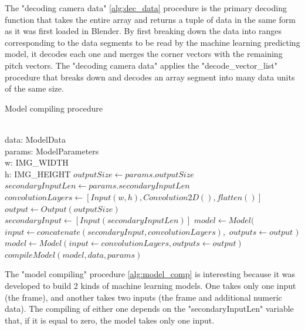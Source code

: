 \documentclass[
    11pt,
    oneside
]{report}
\begin{document}
The "decoding camera data" \ref{alg:dec_data} procedure is the primary decoding function that takes the entire array and returns a tuple of data in the same form as it was first loaded in Blender. By first breaking down the data into ranges corresponding to the data segments to be read by the machine learning predicting model, it decodes each one and merges the corner vectors with the remaining pitch vectors. The "decoding camera data" applies the "decode\_vector\_list" procedure that breaks down and decodes an array segment into many data units of the same size.


\begin{algorithm}[H]
\begin{algorithmic}
\caption{Model compiling procedure}\label{alg:model_comp}
\Require \\
    data: ModelData \\
    params: ModelParameters \\
    w: IMG\_WIDTH \\
    h: IMG\_HEIGHT
\State
\State $outputSize \gets params.outputSize$
\State $secondaryInputLen \gets params.secondaryInputLen$
\State $convolutionLayers \gets [Input(w, h), Convolution2D(), flatten()]$
\State $output \gets Output(outputSize)$
    \State $secondaryInput \gets [Input(secondaryInputLen)]$
    \State $model \gets Model($
        \State \indent $input \gets concatenate(secondaryInput, convolutionLayers),$
            \State \indent $outputs \gets output$
    \State $)$
\Else
    \State $model \gets Model(input \gets convolutionLayers, outputs \gets output)$
\EndIf
\State $compileModel(model, data, params)$
\end{algorithmic}
\end{algorithm}


The "model compiling" procedure \ref{alg:model_comp} is interesting because it was developed to build 2 kinds of machine learning models. One takes only one input (the frame), and another takes two inputs (the frame and additional numeric data). The compiling of either one depends on the "secondaryInputLen" variable that, if it is equal to zero, the model takes only one input.
\end{document}
